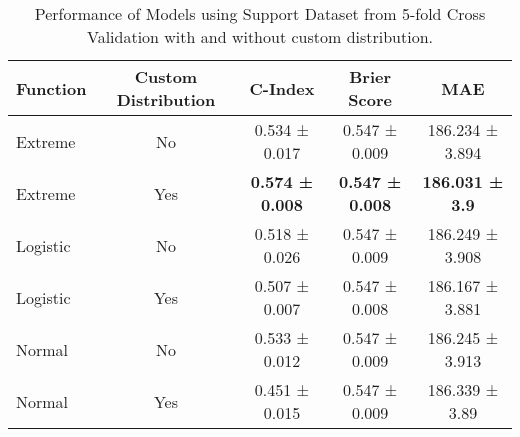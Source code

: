 \begin{table}[h!]
\centering
\caption{Performance of Models using Support Dataset from 5-fold Cross Validation with and without custom distribution.}
\label{tab:model_performance_support_1}
\begin{tabular}{l|c|c|c|c}
\hline
\textbf{Function} & \textbf{Custom Distribution} & \textbf{C-Index} & \textbf{Brier Score} & \textbf{MAE} \\
\hline
Extreme & No & 0.534 ± 0.017 & 0.547 ± 0.009 & 186.234 ± 3.894 \\
Extreme & Yes & \textbf{0.574 ± 0.008} & \textbf{0.547 ± 0.008} & \textbf{186.031 ± 3.9} \\
Logistic & No & 0.518 ± 0.026 & 0.547 ± 0.009 & 186.249 ± 3.908 \\
Logistic & Yes & 0.507 ± 0.007 & 0.547 ± 0.008 & 186.167 ± 3.881 \\
Normal & No & 0.533 ± 0.012 & 0.547 ± 0.009 & 186.245 ± 3.913 \\
Normal & Yes & 0.451 ± 0.015 & 0.547 ± 0.009 & 186.339 ± 3.89 \\
\hline
\end{tabular}
\end{table}
